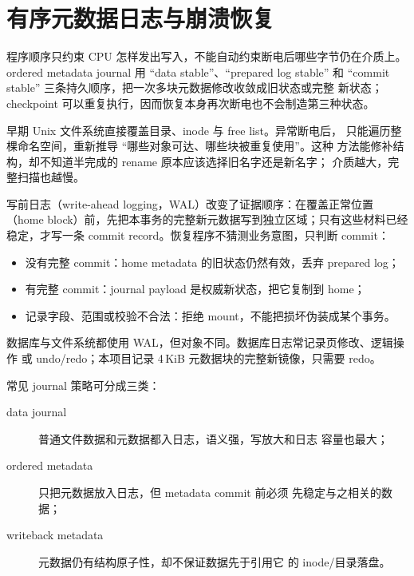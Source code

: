 \section{有序元数据日志与崩溃恢复}

\begin{keyidea}
程序顺序只约束 CPU 怎样发出写入，不能自动约束断电后哪些字节仍在介质上。
ordered metadata journal 用 ``data stable''、``prepared log stable'' 和
``commit stable'' 三条持久顺序，把一次多块元数据修改收敛成旧状态或完整
新状态；checkpoint 可以重复执行，因而恢复本身再次断电也不会制造第三种状态。
\end{keyidea}

早期 Unix 文件系统直接覆盖目录、inode 与 free list。异常断电后，
只能遍历整棵命名空间，重新推导 ``哪些对象可达、哪些块被重复使用''。这种
方法能修补结构，却不知道半完成的 rename 原本应该选择旧名字还是新名字；
介质越大，完整扫描也越慢。

写前日志（write-ahead logging，WAL）改变了证据顺序：在覆盖正常位置
（home block）前，先把本事务的完整新元数据写到独立区域；只有这些材料已经
稳定，才写一条 commit record。恢复程序不猜测业务意图，只判断 commit：

\begin{itemize}
  \item 没有完整 commit：home metadata 的旧状态仍然有效，丢弃 prepared log；
  \item 有完整 commit：journal payload 是权威新状态，把它复制到 home；
  \item 记录字段、范围或校验不合法：拒绝 mount，不能把损坏伪装成某个事务。
\end{itemize}

数据库与文件系统都使用 WAL，但对象不同。数据库日志常记录页修改、逻辑操作
或 undo/redo；本项目记录 4\,KiB 元数据块的完整新镜像，只需要 redo。

常见 journal 策略可分成三类：

\begin{description}
  \item[data journal] 普通文件数据和元数据都入日志，语义强，写放大和日志
    容量也最大；
  \item[ordered metadata] 只把元数据放入日志，但 metadata commit 前必须
    先稳定与之相关的数据；
  \item[writeback metadata] 元数据仍有结构原子性，却不保证数据先于引用它
    的 inode/目录落盘。
\end{description}

